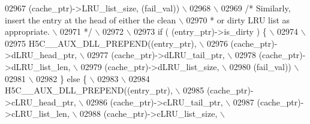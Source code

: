 \begin{DoxyCode}
02967 \textcolor{preprocessor}{                     (cache\_ptr)->LRU\_list\_size, (fail\_val))           \(\backslash\)}
02968 \textcolor{preprocessor}{                                                                       \(\backslash\)}
02969 \textcolor{preprocessor}{    }\textcolor{comment}{/* Similarly, insert the entry at the head of either the clean     \(\backslash\)}
02970 \textcolor{comment}{     * or dirty LRU list as appropriate.                               \(\backslash\)}
02971 \textcolor{comment}{     */}\textcolor{preprocessor}{                                                                \(\backslash\)}
02972 \textcolor{preprocessor}{                                                                       \(\backslash\)}
02973 \textcolor{preprocessor}{    if ( (entry\_ptr)->is\_dirty ) \{                                     \(\backslash\)}
02974 \textcolor{preprocessor}{                                                                       \(\backslash\)}
02975 \textcolor{preprocessor}{        H5C\_\_AUX\_DLL\_PREPEND((entry\_ptr),                              \(\backslash\)}
02976 \textcolor{preprocessor}{                              (cache\_ptr)->dLRU\_head\_ptr,              \(\backslash\)}
02977 \textcolor{preprocessor}{                              (cache\_ptr)->dLRU\_tail\_ptr,              \(\backslash\)}
02978 \textcolor{preprocessor}{                              (cache\_ptr)->dLRU\_list\_len,              \(\backslash\)}
02979 \textcolor{preprocessor}{                              (cache\_ptr)->dLRU\_list\_size,             \(\backslash\)}
02980 \textcolor{preprocessor}{                              (fail\_val))                              \(\backslash\)}
02981 \textcolor{preprocessor}{                                                                       \(\backslash\)}
02982 \textcolor{preprocessor}{    \} else \{                                                           \(\backslash\)}
02983 \textcolor{preprocessor}{                                                                       \(\backslash\)}
02984 \textcolor{preprocessor}{        H5C\_\_AUX\_DLL\_PREPEND((entry\_ptr),                              \(\backslash\)}
02985 \textcolor{preprocessor}{                              (cache\_ptr)->cLRU\_head\_ptr,              \(\backslash\)}
02986 \textcolor{preprocessor}{                              (cache\_ptr)->cLRU\_tail\_ptr,              \(\backslash\)}
02987 \textcolor{preprocessor}{                              (cache\_ptr)->cLRU\_list\_len,              \(\backslash\)}
02988 \textcolor{preprocessor}{                              (cache\_ptr)->cLRU\_list\_size,             \(\backslash\)}

\end{DoxyCode}
